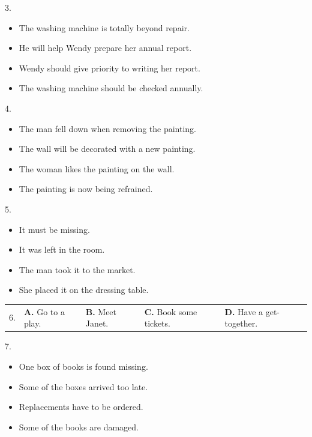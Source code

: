 \documentclass[UTF8,11pt]{ctexart}
\begin{document}
3.


\begin{itemize}[leftmargin=2em,itemsep=.2em,topsep=.4em]\item[A.] The washing machine is totally beyond repair.
\item[B.] He will help Wendy prepare her annual report.
\item[C.] Wendy should give priority to writing her report.
\item[D.] The washing machine should be checked annually.
\end{itemize}

4.


\begin{itemize}[leftmargin=2em,itemsep=.2em,topsep=.4em]\item[A.] The man fell down when removing the painting.
\item[B.] The wall will be decorated with a new painting.
\item[C.] The woman likes the painting on the wall.
\item[D.] The painting is now being refrained.
\end{itemize}

5.


\begin{itemize}[leftmargin=2em,itemsep=.2em,topsep=.4em]\item[A.] It must be missing.
\item[B.] It was left in the room.
\item[C.] The man took it to the market.
\item[D.] She placed it on the dressing table.
\end{itemize}

\noindent\begin{tabularx}{\linewidth}{@{}lXXXX@{}}6. & \textbf{A.} Go to a play. & \textbf{B.} Meet Janet. & \textbf{C.} Book some tickets. & \textbf{D.} Have a get-together.\\\end{tabularx}\par

7.


\begin{itemize}[leftmargin=2em,itemsep=.2em,topsep=.4em]\item[A.] One box of books is found missing.
\item[B.] Some of the boxes arrived too late.
\item[C.] Replacements have to be ordered.
\item[D.] Some of the books are damaged.
\end{itemize}
\end{document}
